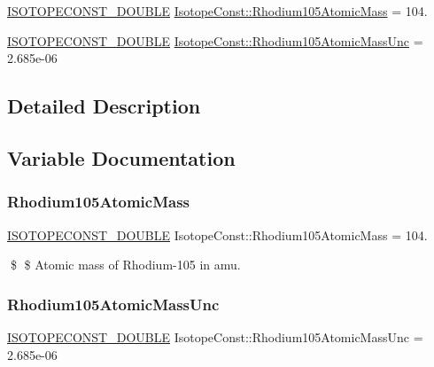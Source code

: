 \begin{DoxyCompactItemize}
\item 
\mbox{\hyperlink{group___isotope_const-_macros_ga8f45a7272ce02c0b4c65c44636ed719a}{I\+S\+O\+T\+O\+P\+E\+C\+O\+N\+S\+T\+\_\+\+D\+O\+U\+B\+LE}} \mbox{\hyperlink{group___isotope_const-_rhodium-_rh105_ga6ce8cbaf88881be29beefdbfb4a1c04b}{Isotope\+Const\+::\+Rhodium105\+Atomic\+Mass}} = 104.
\item 
\mbox{\hyperlink{group___isotope_const-_macros_ga8f45a7272ce02c0b4c65c44636ed719a}{I\+S\+O\+T\+O\+P\+E\+C\+O\+N\+S\+T\+\_\+\+D\+O\+U\+B\+LE}} \mbox{\hyperlink{group___isotope_const-_rhodium-_rh105_ga81511ccde2b7403701f130712e4cb34f}{Isotope\+Const\+::\+Rhodium105\+Atomic\+Mass\+Unc}} = 2.\+685e-\/06
\end{DoxyCompactItemize}


\subsection{Detailed Description}


\subsection{Variable Documentation}
\mbox{\label{group___isotope_const-_rhodium-_rh105_ga6ce8cbaf88881be29beefdbfb4a1c04b}} 
\subsubsection{\texorpdfstring{Rhodium105\+Atomic\+Mass}{Rhodium105AtomicMass}}
{\footnotesize\ttfamily \mbox{\hyperlink{group___isotope_const-_macros_ga8f45a7272ce02c0b4c65c44636ed719a}{I\+S\+O\+T\+O\+P\+E\+C\+O\+N\+S\+T\+\_\+\+D\+O\+U\+B\+LE}} Isotope\+Const\+::\+Rhodium105\+Atomic\+Mass = 104.}

\$ \$ Atomic mass of Rhodium-\/105 in amu. \mbox{\label{group___isotope_const-_rhodium-_rh105_ga81511ccde2b7403701f130712e4cb34f}} 
\subsubsection{\texorpdfstring{Rhodium105\+Atomic\+Mass\+Unc}{Rhodium105AtomicMassUnc}}
{\footnotesize\ttfamily \mbox{\hyperlink{group___isotope_const-_macros_ga8f45a7272ce02c0b4c65c44636ed719a}{I\+S\+O\+T\+O\+P\+E\+C\+O\+N\+S\+T\+\_\+\+D\+O\+U\+B\+LE}} Isotope\+Const\+::\+Rhodium105\+Atomic\+Mass\+Unc = 2.\+685e-\/06}

